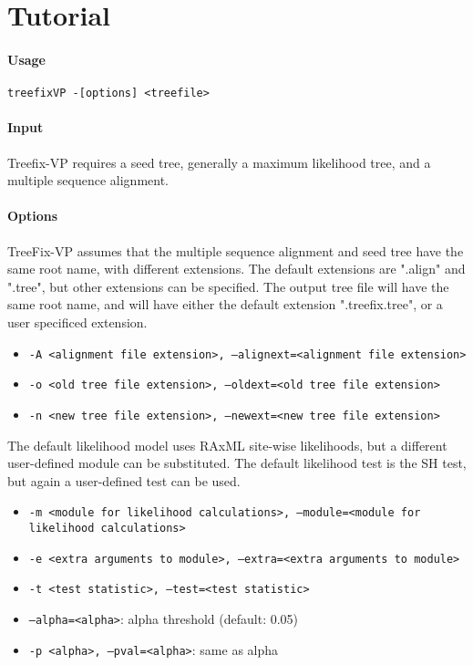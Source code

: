 \documentclass[11pt]{article}
\begin{document}
\section{Tutorial}

\paragraph{Usage}
\texttt{treefixVP -[options] <treefile>}

\paragraph{Input}
Treefix-VP requires a seed tree, generally a maximum likelihood tree, and a multiple sequence alignment.

\paragraph{Options}
TreeFix-VP assumes that the multiple sequence alignment and seed tree have the same root name, with
different extensions. The default extensions are ".align" and ".tree", but other extensions can be specified.
The output tree file will have the same root name, and will have either the default extension
".treefix.tree", or a user specificed extension.

\begin{itemize}
    \item \texttt{-A <alignment file extension>, --alignext=<alignment file extension>}
    \item \texttt{-o <old tree file extension>, --oldext=<old tree file extension>}
    \item \texttt{-n <new tree file extension>, --newext=<new tree file extension>}
\end{itemize}

The default likelihood model uses RAxML site-wise likelihoods, but a different user-defined
module can be substituted. The default likelihood test is the SH test, but again a user-defined
test can be used. 

\begin{itemize}
    \item \texttt{-m <module for likelihood calculations>, --module=<module for likelihood calculations>}
    \item \texttt{-e <extra arguments to module>, --extra=<extra arguments to module>}
    \item \texttt{-t <test statistic>, --test=<test statistic>}
    \item \texttt{--alpha=<alpha>}: alpha threshold (default: 0.05)
    \item \texttt{-p <alpha>, --pval=<alpha>}: same as alpha
\end{itemize}
\end{document}
